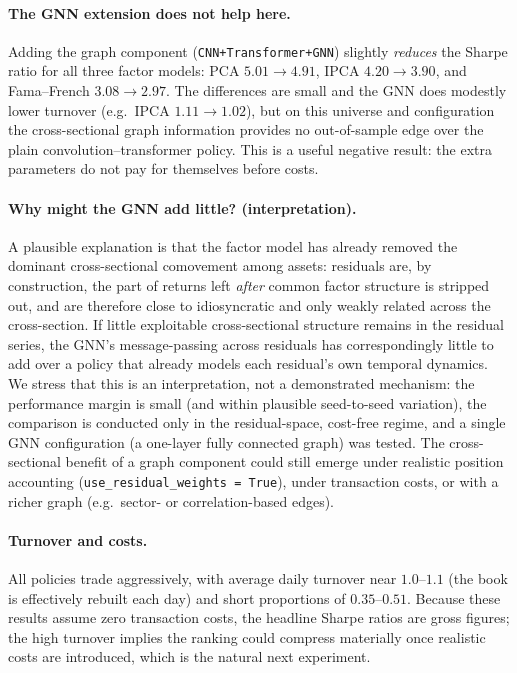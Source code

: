 \documentclass[11pt]{article}
\begin{document}
\paragraph{The GNN extension does not help here.} Adding the graph component
(\texttt{CNN+Transformer+GNN}) slightly \emph{reduces} the Sharpe ratio for all
three factor models: PCA $5.01 \to 4.91$, IPCA $4.20 \to 3.90$, and Fama--French
$3.08 \to 2.97$. The differences are small and the GNN does modestly lower turnover
(e.g.\ IPCA $1.11 \to 1.02$), but on this universe and configuration the
cross-sectional graph information provides no out-of-sample edge over the plain
convolution--transformer policy. This is a useful negative result: the extra
parameters do not pay for themselves before costs.

\paragraph{Why might the GNN add little? (interpretation).} A plausible explanation
is that the factor model has already removed the dominant cross-sectional comovement
among assets: residuals are, by construction, the part of returns left \emph{after}
common factor structure is stripped out, and are therefore close to idiosyncratic
and only weakly related across the cross-section. If little exploitable
cross-sectional structure remains in the residual series, the GNN's message-passing
across residuals has correspondingly little to add over a policy that already models
each residual's own temporal dynamics. We stress that this is an interpretation, not
a demonstrated mechanism: the performance margin is small (and within plausible
seed-to-seed variation), the comparison is conducted only in the residual-space,
cost-free regime, and a single GNN configuration (a one-layer fully connected graph)
was tested. The cross-sectional benefit of a graph component could still emerge under
realistic position accounting (\texttt{use\_residual\_weights = True}), under
transaction costs, or with a richer graph (e.g.\ sector- or correlation-based edges).

\paragraph{Turnover and costs.} All policies trade aggressively, with average daily
turnover near $1.0$--$1.1$ (the book is effectively rebuilt each day) and short
proportions of $0.35$--$0.51$. Because these results assume zero transaction costs,
the headline Sharpe ratios are gross figures; the high turnover implies the
ranking could compress materially once realistic costs are introduced, which is the
natural next experiment.
\end{document}
